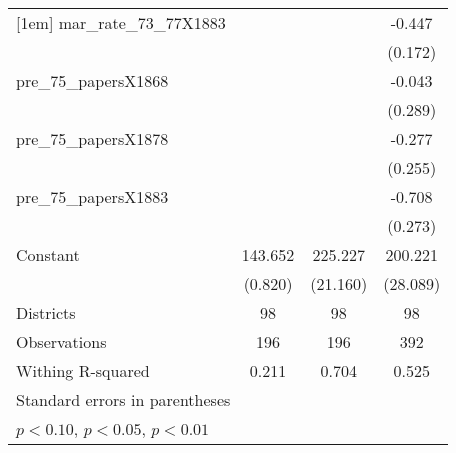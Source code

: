 {\begin{tabular}{l*{3}{c}}
[1em]
mar\_rate\_73\_77X1883 &                     &                     &      -0.447\sym{**} \\
                    &                     &                     &     (0.172)         \\
[1em]
pre\_75\_papersX1868  &                     &                     &      -0.043         \\
                    &                     &                     &     (0.289)         \\
[1em]
pre\_75\_papersX1878  &                     &                     &      -0.277         \\
                    &                     &                     &     (0.255)         \\
[1em]
pre\_75\_papersX1883  &                     &                     &      -0.708\sym{**} \\
                    &                     &                     &     (0.273)         \\
[1em]
Constant            &     143.652\sym{***}&     225.227\sym{***}&     200.221\sym{***}\\
                    &     (0.820)         &    (21.160)         &    (28.089)         \\
\hline
Districts           &          98         &          98         &          98         \\
Observations        &         196         &         196         &         392         \\
Withing R-squared   &       0.211         &       0.704         &       0.525         \\
\hline\hline
\multicolumn{4}{l}{\footnotesize Standard errors in parentheses}\\
\multicolumn{4}{l}{\footnotesize \sym{*} \(p<0.10\), \sym{**} \(p<0.05\), \sym{***} \(p<0.01\)}\\
\end{tabular}
}
